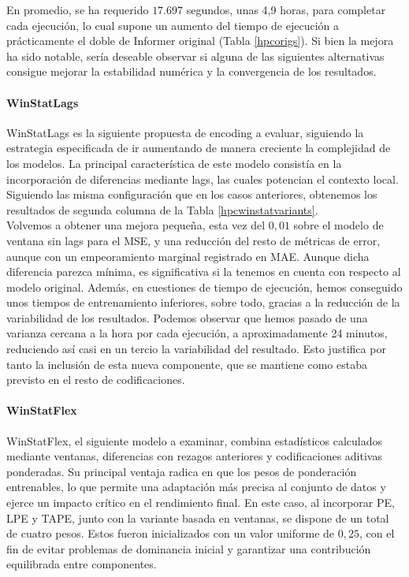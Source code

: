 En promedio, se ha requerido $17.697$ segundos, unas 4,9 horas, para completar cada ejecución, lo cual supone un aumento del tiempo de ejecución a prácticamente el doble de Informer original (Tabla \ref{hpcorigs}). Si bien la mejora ha sido notable, sería deseable observar si alguna de las siguientes alternativas consigue mejorar la estabilidad numérica y la convergencia de los resultados.

\paragraph{WinStatLags}

WinStatLags es la siguiente propuesta de encoding a evaluar, siguiendo la estrategia especificada de ir aumentando de manera creciente la complejidad de los modelos. La principal característica de este modelo consistía en la incorporación de diferencias mediante lags, las cuales potencian el contexto local. Siguiendo las misma configuración que en los casos anteriores, obtenemos los resultados de segunda columna de la Tabla \ref{hpcwinstatvariants}.\\

Volvemos a obtener una mejora pequeña, esta vez del $0,01$ sobre el modelo de ventana sin lags para el MSE, y una reducción del resto de métricas de error, aunque con un empeoramiento marginal registrado en MAE. Aunque dicha diferencia parezca mínima, es significativa si la tenemos en cuenta con respecto al modelo original. Además, en cuestiones de tiempo de ejecución, hemos conseguido unos tiempos de entrenamiento inferiores, sobre todo, gracias a la reducción de la variabilidad de los resultados. Podemos observar que hemos pasado de una varianza cercana a la hora por cada ejecución, a aproximadamente 24 minutos, reduciendo así casi en un tercio la variabilidad del resultado. Esto justifica por tanto la inclusión de esta nueva componente, que se mantiene como estaba previsto en el resto de codificaciones.

\paragraph{WinStatFlex}

WinStatFlex, el siguiente modelo a examinar, combina estadísticos calculados mediante ventanas, diferencias con rezagos anteriores y codificaciones aditivas ponderadas. Su principal ventaja radica en que los pesos de ponderación entrenables, lo que permite una adaptación más precisa al conjunto de datos y ejerce un impacto crítico en el rendimiento final. En este caso, al incorporar PE, LPE y TAPE, junto con la variante basada en ventanas, se dispone de un total de cuatro pesos. Estos fueron inicializados con un valor uniforme de $0,25$, con el fin de evitar problemas de dominancia inicial y garantizar una contribución equilibrada entre componentes.\\

